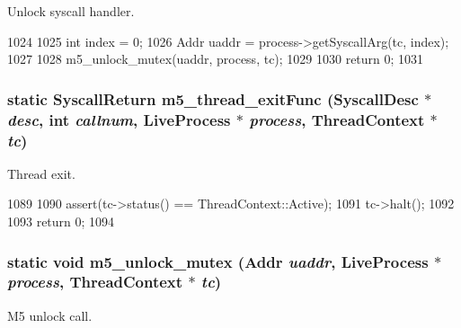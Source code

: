 Unlock syscall handler. 


\begin{DoxyCode}
1024     {
1025         int index = 0;
1026         Addr uaddr = process->getSyscallArg(tc, index);
1027 
1028         m5_unlock_mutex(uaddr, process, tc);
1029 
1030         return 0;
1031     }
\end{DoxyCode}
\hypertarget{classTru64_a56f0a437d8a86b1220497375406a3f78}{
\subsubsection[{m5\_\-thread\_\-exitFunc}]{\setlength{\rightskip}{0pt plus 5cm}static {\bf SyscallReturn} m5\_\-thread\_\-exitFunc ({\bf SyscallDesc} $\ast$ {\em desc}, \/  int {\em callnum}, \/  {\bf LiveProcess} $\ast$ {\em process}, \/  {\bf ThreadContext} $\ast$ {\em tc})}}
\label{classTru64_a56f0a437d8a86b1220497375406a3f78}


Thread exit. 


\begin{DoxyCode}
1089     {
1090         assert(tc->status() == ThreadContext::Active);
1091         tc->halt();
1092 
1093         return 0;
1094     }
\end{DoxyCode}
\hypertarget{classTru64_ac965ae70992f9a6f184c1e6f177e3b5b}{
\subsubsection[{m5\_\-unlock\_\-mutex}]{\setlength{\rightskip}{0pt plus 5cm}static void m5\_\-unlock\_\-mutex ({\bf Addr} {\em uaddr}, \/  {\bf LiveProcess} $\ast$ {\em process}, \/  {\bf ThreadContext} $\ast$ {\em tc})}}
\label{classTru64_ac965ae70992f9a6f184c1e6f177e3b5b}


M5 unlock call. 


